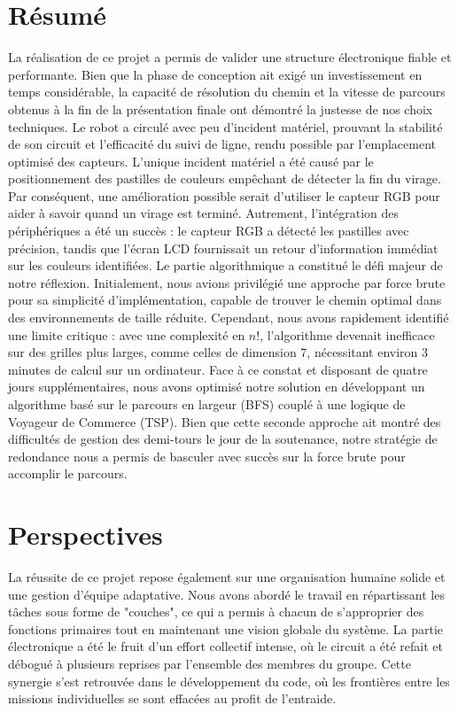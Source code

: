 \section{Résumé}

La réalisation de ce projet a permis de valider une structure électronique fiable et performante. Bien que la phase de conception ait exigé un investissement en temps considérable, la capacité de résolution du chemin et la vitesse de parcours obtenus à la fin de la présentation finale ont démontré la justesse de nos choix techniques. Le robot a circulé avec peu d'incident matériel, prouvant la stabilité de son circuit et l'efficacité du suivi de ligne, rendu possible par l'emplacement optimisé des capteurs. L'unique incident matériel a été causé par le positionnement des pastilles de couleurs empêchant de détecter la fin du virage. Par conséquent, une amélioration possible serait d'utiliser le capteur RGB pour aider à savoir quand un virage est terminé. Autrement, l'intégration des périphériques a été un succès : le capteur RGB a détecté les pastilles avec précision, tandis que l'écran LCD fournissait un retour d'information immédiat sur les couleurs identifiées.                                                                                                                                  
Le partie algorithmique a constitué le défi majeur de notre réflexion. Initialement, nous avions privilégié une approche par force brute pour sa simplicité d'implémentation, capable de trouver le chemin optimal dans des environnements de taille réduite. Cependant, nous avons rapidement identifié une limite critique : avec une complexité en $n!$, l'algorithme devenait inefficace sur des grilles plus larges, comme celles de dimension 7, nécessitant environ 3 minutes de calcul sur un ordinateur. Face à ce constat et disposant de quatre jours supplémentaires, nous avons optimisé notre solution en développant un algorithme basé sur le parcours en largeur (BFS) couplé à une logique de Voyageur de Commerce (TSP). Bien que cette seconde approche ait montré des difficultés de gestion des demi-tours le jour de la soutenance, notre stratégie de redondance nous a permis de basculer avec succès sur la force brute pour accomplir le parcours.


\section{Perspectives}

La réussite de ce projet repose également sur une organisation humaine solide et une gestion d'équipe adaptative. Nous avons abordé le travail en répartissant les tâches sous forme de "couches", ce qui a permis à chacun de s'approprier des fonctions primaires tout en maintenant une vision globale du système. La partie électronique a été le fruit d'un effort collectif intense, où le circuit a été refait et débogué à plusieurs reprises par l'ensemble des membres du groupe. Cette synergie s'est retrouvée dans le développement du code, où les frontières entre les missions individuelles se sont effacées au profit de l'entraide.

